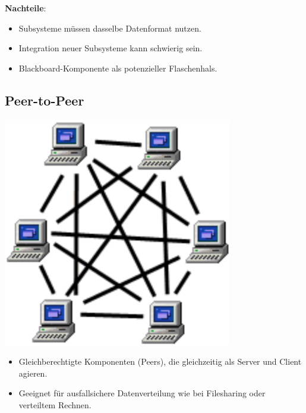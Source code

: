 \documentclass[11pt, a4paper]{article}
\begin{document}
\textbf{Nachteile}:
\begin{itemize}
    \item Subsysteme müssen dasselbe Datenformat nutzen.
    \item Integration neuer Subsysteme kann schwierig sein.
    \item Blackboard-Komponente als potenzieller Flaschenhals.
\end{itemize}

\newpage

\subsection{Peer-to-Peer}

\vspace{1em}

\begin{minipage}[h]{0.2\textwidth}
    \centering \includegraphics[width=0.75\textwidth]{PtP-00.png} \raggedright
\end{minipage}
\begin{minipage}[h]{0.75\textwidth}
    \begin{itemize}
        \item Gleichberechtigte Komponenten (Peers), die gleichzeitig als Server und Client agieren.
        \item Geeignet für ausfallsichere Datenverteilung wie bei Filesharing oder verteiltem Rechnen.
    \end{itemize}
\end{minipage}
\end{document}
